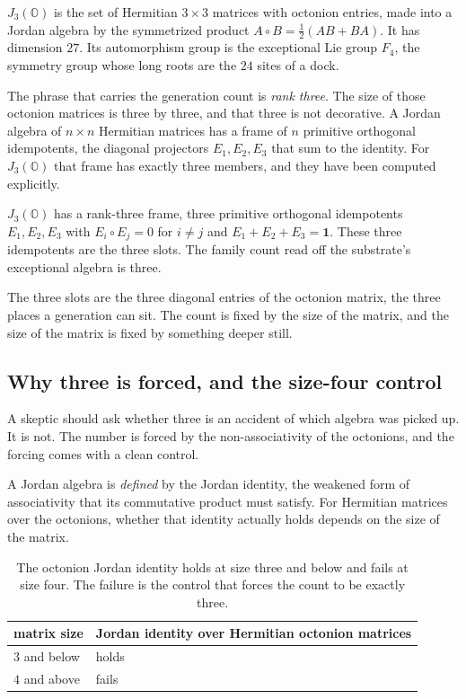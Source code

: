 \begin{definition}
$J_3(\mathbb{O})$ is the set of Hermitian $3 \times 3$ matrices with octonion entries, made into a Jordan algebra by the symmetrized product $A \circ B = \tfrac{1}{2}(AB + BA)$. It has dimension $27$. Its automorphism group is the exceptional Lie group $F_4$, the symmetry group whose long roots are the $24$ sites of a dock.
\end{definition}

The phrase that carries the generation count is \emph{rank three}. The size of those octonion matrices is three by three, and that three is not decorative. A Jordan algebra of $n \times n$ Hermitian matrices has a frame of $n$ primitive orthogonal idempotents, the diagonal projectors $E_1, E_2, E_3$ that sum to the identity. For $J_3(\mathbb{O})$ that frame has exactly three members, and they have been computed explicitly.

\begin{proposition}
$J_3(\mathbb{O})$ has a rank-three frame, three primitive orthogonal idempotents $E_1, E_2, E_3$ with $E_i \circ E_j = 0$ for $i \neq j$ and $E_1 + E_2 + E_3 = \mathbf{1}$. These three idempotents are the three slots. The family count read off the substrate's exceptional algebra is three.
\end{proposition}

The three slots are the three diagonal entries of the octonion matrix, the three places a generation can sit. The count is fixed by the size of the matrix, and the size of the matrix is fixed by something deeper still.

\subsection{Why three is forced, and the size-four control}

A skeptic should ask whether three is an accident of which algebra was picked up. It is not. The number is forced by the non-associativity of the octonions, and the forcing comes with a clean control.

A Jordan algebra is \emph{defined} by the Jordan identity, the weakened form of associativity that its commutative product must satisfy. For Hermitian matrices over the octonions, whether that identity actually holds depends on the size of the matrix.

\begin{table}[ht]
\centering
\begin{tabular}{@{}ll@{}}
\toprule
matrix size & Jordan identity over Hermitian octonion matrices \\
\midrule
$3$ and below & holds \\
$4$ and above & fails \\
\bottomrule
\end{tabular}
\caption{The octonion Jordan identity holds at size three and below and fails at size four. The failure is the control that forces the count to be exactly three.}
\label{tab:jordan-size}
\end{table}

